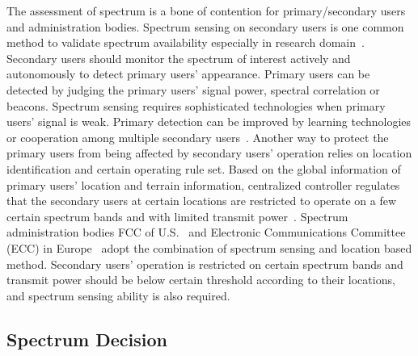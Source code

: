 The assessment of spectrum is a bone of contention for primary/secondary users and administration bodies.
Spectrum sensing on secondary users is one common method to validate spectrum availability especially in research domain~\cite{crnsensing_09}.
Secondary users should monitor the spectrum of interest actively and autonomously to detect primary users' appearance.
Primary users can be detected by judging the primary users' signal power, spectral correlation or beacons.
Spectrum sensing requires sophisticated technologies when primary users' signal is weak.
Primary detection can be improved by learning technologies or cooperation among multiple secondary users~\cite{coorperativeSensing_Akyildiz11}.
Another way to protect the primary users from being affected by secondary users' operation relies on location identification and certain operating rule set.
Based on the global information of primary users' location and terrain information, centralized controller regulates that the secondary users at certain locations are restricted to operate on a few certain spectrum bands and with limited transmit power~\cite{whitefi09}.
Spectrum administration bodies FCC of U.S.~\cite{FCC_2010_sedond_memorandumm} and Electronic Communications Committee (ECC) in Europe~\cite{ecc159} adopt the combination of spectrum sensing and location based method.
Secondary users' operation is restricted on certain spectrum bands and transmit power should be below certain threshold according  to their locations, and spectrum sensing ability is also required.






\subsection{Spectrum Decision}

